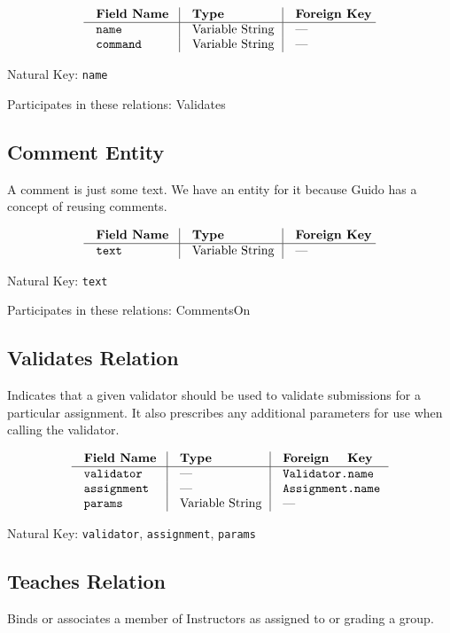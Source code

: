 $$\vbox{
  \offinterlineskip
  \halign{
    \strut \quad {\tt #}  & \vrule\quad #  & \vrule\quad # \cr
    {\bf Field Name}  & {\bf Type}  & {\bf Foreign Key}\cr
    \noalign{\hrule}    
    name  & Variable String  & --- \cr
    command  & Variable String  & --- \cr
  }
}$$

{\noindent
Natural Key: {\tt name}\par\noindent
Participates in these relations: Validates \par}

\subsection{Comment Entity}
A comment is just some text.
We have an entity for it because Guido has a concept of reusing comments.

$$\vbox{
  \offinterlineskip
  \halign{
    \strut \quad {\tt #}  & \vrule\quad #  & \vrule\quad # \cr
    {\bf Field Name}  & {\bf Type}  & {\bf Foreign Key}\cr
    \noalign{\hrule}    
    text  & Variable String  & --- \cr
  }
}$$

{\noindent
Natural Key: {\tt text}\par\noindent
Participates in these relations: CommentsOn \par}

\subsection{Validates Relation}
Indicates that a given validator should be used to validate 
submissions for a particular assignment. It also prescribes any 
additional parameters for use when calling the validator.

$$\vbox{
  \offinterlineskip
  \halign{
    \strut \quad {\tt #}  & \vrule\quad #  & \vrule\quad # \cr
    {\bf Field Name}  & {\bf Type}  & {\bf Foreign Key}\cr
    \noalign{\hrule}    
    validator  & ---  & {\tt Validator.name} \cr
    assignment  & ---  & {\tt Assignment.name} \cr
    params  & Variable String  & --- \cr
  }
}$$

{\noindent
Natural Key: {\tt validator}, {\tt assignment}, {\tt params}\par}

\subsection{Teaches Relation}
Binds or associates a member of Instructors as assigned to or grading a group.

